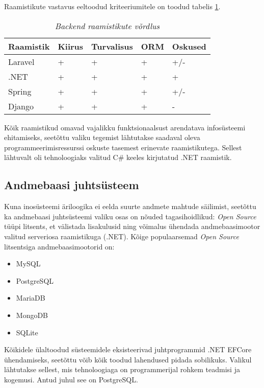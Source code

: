 Raamistikute vastavus eeltoodud kriteeriumitele on toodud tabelis \ref{tab:requirements}.
\begin{longtable}{|p{3cm}|p{2.5cm}|p{2.5cm}|p{2.5cm}|p{2.5cm}|}
	\caption{\it{Backend raamistikute võrdlus}}
	\label{tab:requirements}\\ \hline
	\textbf{Raamistik} &  \textbf{Kiirus} & \textbf{Turvalisus}  & \textbf{ORM} & \textbf{Oskused} \\
	\hline
	\endhead
	\endfoot
	\hline
	\endlastfoot
Laravel & + & + & + & +/-  \\ \hline
.NET    & + & + & + & +  \\ \hline
Spring  & + & + & + & +/-  \\ \hline
Django  & + & + & + & -  \\ \hline
\end{longtable}

Kõik raamistikud omavad vajalikku funktsionaalsust arendatava infosüsteemi ehitamiseks, seetõttu valiku tegemist 
lähtutakse saadaval oleva programmeerimisressurssi oskuste tasemest erinevate raamistikutega. Sellest lähtuvalt
oli tehnoloogiaks valitud C\# keeles kirjutatud .NET raamistik.

\subsection{Andmebaasi juhtsüsteem}
Kuna inosüsteemi äriloogika ei eelda suurte andmete mahtude säilimist, seetõttu ka andmebaasi juhtsüsteemi 
valiku osas on nõuded tagasihoidlikud: \textit{Open Source} tüüpi litsents, et välistada lisakulusid ning
võimalus ühendada andmebaasimootor valitud serveriosa raamistikuga (.NET). Kõige populaarsemad 
\textit{Open Source} litsentsiga andmebaasimootorid on:
\begin{itemize}
    \item MySQL
    \item PostgreSQL
    \item MariaDB
    \item MongoDB
    \item SQLite
\end{itemize}
Kõikidele ülaltoodud süsteemidele eksisteerivad juhtprogrammid .NET EFCore ühendamiseks, seetõttu võib kõik
toodud lahendused pidada sobilikuks. Valikul lähtutakse sellest, mis tehnoloogiaga on programmerijal rohkem teadmisi 
ja kogemusi. Antud juhul see on PostgreSQL. 

